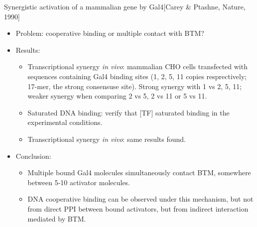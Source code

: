 \documentclass{report}
\begin{document}
Synergistic activation of a mammalian gene by Gal4[Carey \& Ptashne, Nature, 1990]
\begin{itemize}
	\item Problem: cooperative binding or multiple contact with BTM?
	
	\item Results: 
	\begin{itemize}
		\item Transcriptional synergy {\em in vivo}: mammalian CHO cells transfected with sequences containing Gal4 binding sites (1, 2, 5, 11 copies resprectively; 17-mer, the strong consensuse site). Strong synergy with 1 vs 2, 5, 11; weaker synergy when comparing 2 vs 5, 2 vs 11 or 5 vs 11. 
		
		\item Saturated DNA binding: verify  that [TF] saturated binding in the experimental conditions. 
		
		\item Transcriptional synergy {\em in vivo}: same results found. 
	\end{itemize}
	
	\item Conclusion: 
	\begin{itemize}
		\item Multiple bound Gal4 molecules simultaneously contact BTM, somewhere between 5-10 activator molecules. 
		\item DNA cooperative binding can be observed under this mechanism, but not from direct PPI between bound activators, but from indirect interaction mediated by BTM. 
	\end{itemize}
\end{itemize}
\end{document}
